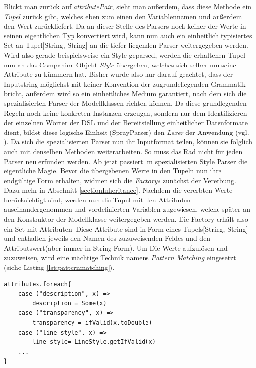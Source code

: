 Blickt man zurück auf \textit{attributePair}, sieht man außerdem, dass diese Methode ein \textit{Tupel} zurück gibt, welches eben zum einen den Variablennamen und außerdem den Wert zurückliefert.
Da an dieser Stelle des Parsers noch keiner der Werte in seinen eigentlichen Typ konvertiert wird, kann nun auch ein einheitlich typisiertes Set an Tupel[String, String] an die tiefer liegenden Parser weitergegeben werden.
Wird also gerade beispielsweise ein Style geparsed, werden die erhaltenen Tupel nun an das Companion Objekt \textit{Style} übergeben, welches sich selber um seine Attribute zu kümmern hat.
Bisher wurde also nur darauf geachtet, dass der Inputstring möglichst mit keiner Konvention der zugrundeliegenden Grammatik bricht, außerdem wird so ein einheitliches Medium garantiert, nach dem sich die spezialisierten Parser der Modellklassen richten können. Da diese grundlegenden Regeln noch keine konkreten Instanzen erzeugen, sondern nur dem Identifizieren der einzelnen Wörter der DSL und der Bereitstellung einheitlicher Datenformate dient, bildet diese logische Einheit (SprayParser) den \textit{Lexer} der Anwendung (vgl. ).
Da sich die spezialisierten Parser nun ihr Inputformat teilen, können sie folglich auch mit denselben Methoden weiterarbeiten.
So muss das Rad nicht für jeden Parser neu erfunden werden.
Ab jetzt passiert im spezialisierten Style Parser die eigentliche Magie.
Bevor die übergebenen Werte in den Tupeln nun ihre endgültige Form erhalten, widmen sich die \textit{Factorys} zunächst der Vererbung. Dazu mehr in Abschnitt \ref{sectionInheritance}.
Nachdem die vererbten Werte berücksichtigt sind, werden nun die Tupel mit den Attributen auseinandergenommen und vordefinierten Variablen zugewiesen, welche später an den Konstruktor der Modellklasse weitergegeben werden.
Die Factory erhält also ein Set mit Attributen. Diese Attribute sind in Form eines Tupels[String, String] und enthalten jeweils den Namen des zuzuweisenden Feldes und den Attributswert(aber immer in String Form). Um Die Werte aufzulösen und zuzuweisen, wird eine mächtige Technik namens \textit{Pattern Matching} eingesetzt (siehe Listing \ref{lst:patternmatching}).
\begin{lstlisting}[style=scala, caption = {Auszug aus dem Code zum Pattern Matching}, label = {lst:patternmatching}]
attributes.foreach{
    case ("description", x) => 
    	description = Some(x)
    case ("transparency", x) => 
    	transparency = ifValid(x.toDouble)
    case ("line-style", x) => 
    	line_style= LineStyle.getIfValid(x)
    ...
}
\end{lstlisting}
